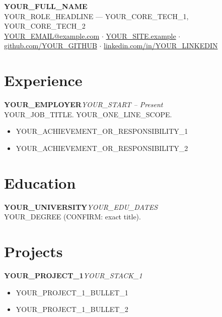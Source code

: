 \documentclass[10pt,a4paper]{article}
\newcommand{\entry}[2]{\textbf{#1}\hfill\textit{#2}\\}
\begin{document}
\begin{center}
  {\LARGE\bfseries YOUR_FULL_NAME}\\[3pt]
  YOUR_ROLE_HEADLINE --- YOUR_CORE_TECH_1, YOUR_CORE_TECH_2\\[3pt]
  \href{mailto:YOUR_EMAIL@example.com}{YOUR_EMAIL@example.com} $\cdot$
  \href{https://YOUR_SITE.example}{YOUR_SITE.example} $\cdot$
  \href{https://github.com/YOUR_GITHUB}{github.com/YOUR_GITHUB} $\cdot$
  \href{https://www.linkedin.com/in/YOUR_LINKEDIN/}{linkedin.com/in/YOUR_LINKEDIN}
\end{center}

\vspace{-4pt}

\section*{Experience}

\entry{YOUR_EMPLOYER}{YOUR_START -- Present}
YOUR_JOB_TITLE. YOUR_ONE_LINE_SCOPE.
\begin{itemize}
  \item YOUR_ACHIEVEMENT_OR_RESPONSIBILITY_1
  \item YOUR_ACHIEVEMENT_OR_RESPONSIBILITY_2
\end{itemize}

\section*{Education}
\entry{YOUR_UNIVERSITY}{YOUR_EDU_DATES}
YOUR_DEGREE (CONFIRM: exact title).

\section*{Projects}

\entry{YOUR_PROJECT_1}{YOUR_STACK_1}
\begin{itemize}
  \item YOUR_PROJECT_1_BULLET_1
  \item YOUR_PROJECT_1_BULLET_2
\end{itemize}
\end{document}
